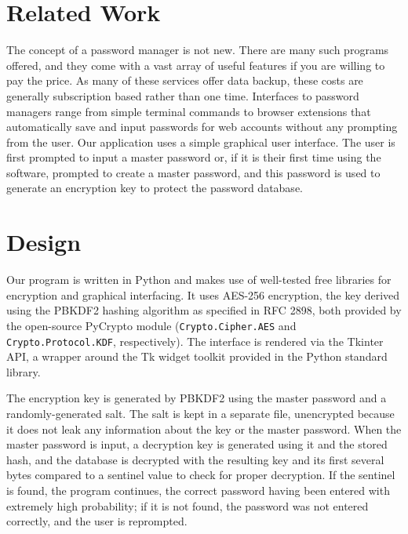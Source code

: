 \documentclass [oneside, letterpaper] {article}
\begin{document}
    \section {Related Work}
        The concept of a password manager is not new. There are many such
        programs offered, and they come with a vast array of useful features if
        you are willing to pay the price. As many of these services offer data
        backup, these costs are generally subscription based rather than one
        time. Interfaces to password managers range from simple terminal
        commands to browser extensions that automatically save and input
        passwords for web accounts without any prompting from the user. Our
        application uses a simple graphical user interface. The user is first
        prompted to input a master password or, if it is their first time using
        the software, prompted to create a master password, and this password is
        used to generate an encryption key to protect the password database.

    \section {Design}
        Our program is written in Python and makes use of well-tested free
        libraries for encryption and graphical interfacing. It uses AES-256
        encryption, the key derived using the PBKDF2 hashing algorithm as
        specified in RFC 2898, both provided by the open-source PyCrypto module
        (\texttt{Crypto.Cipher.AES} and \texttt{Crypto.Protocol.KDF},
        respectively). The interface is rendered via the Tkinter API, a wrapper
        around the Tk widget toolkit provided in the Python standard library.

        The encryption key is generated by PBKDF2 using the master password and
        a randomly-generated salt. The salt is kept in a separate file,
        unencrypted because it does not leak any information about the key or
        the master password. When the master password is input, a decryption
        key is generated using it and the stored hash, and the database is
        decrypted with the resulting key and its first several bytes compared
        to a sentinel value to check for proper decryption. If the sentinel is
        found, the program continues, the correct password having been entered
        with extremely high probability; if it is not found, the password was
        not entered correctly, and the user is reprompted.
\end{document}
